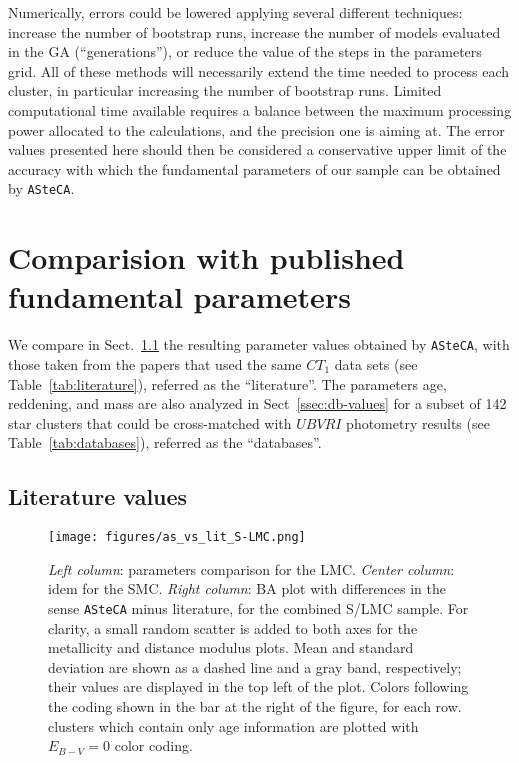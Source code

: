 \documentclass{aa}
\begin{document}
Numerically, errors could be lowered applying several different techniques:
increase the number of bootstrap runs, increase the number of models evaluated
in the GA (``generations''), or reduce the value of the steps in the parameters
grid.
%
All of these methods will necessarily extend the time needed to process each
cluster, in particular increasing the number of bootstrap runs. Limited
computational time available requires a balance between the maximum processing
power allocated to the calculations, and the precision one is aiming at. The
error values presented here should then be considered a conservative upper limit
of the accuracy with which the fundamental parameters of our sample can be
obtained by \texttt{ASteCA}.\@





\section{Comparision with published fundamental parameters}
\label{sec:comp-pub-data}

We compare in Sect.~\ref{ssec:lit-values} the resulting parameter values
obtained by \texttt{ASteCA}, with those taken from the papers that used the same
$CT_1$ data sets (see Table~\ref{tab:literature}), referred as the
``literature''.
%
The parameters age, reddening, and mass are also analyzed in
Sect~\ref{ssec:db-values} for a subset of 142 star clusters that could be
cross-matched with $UBVRI$ photometry results (see Table~\ref{tab:databases}),
referred as the ``databases''.

  

\subsection{Literature values}
\label{ssec:lit-values}

\begin{figure*}
\texttt{[image: figures/as\_vs\_lit\_S-LMC.png]}
\caption{\emph{Left column}: parameters comparison for the LMC.\@
\emph{Center column}: idem for the SMC.\@
\emph{Right column}: BA plot with differences in the sense \texttt{ASteCA} minus
literature, for the combined S/LMC sample. For clarity, a small random scatter
is added to both axes for the metallicity and distance modulus plots. Mean and
standard deviation are shown as a dashed line and a gray band, respectively;
their values are displayed in the top left of the plot.
Colors following the coding shown in the bar at the right of the figure, for
each row.~\cite{Piatti_2011b} clusters which contain only age information are
plotted with $E_{B-V}{=}0$ color coding.}
\label{fig:as_vs_lit}
\end{figure*}
\end{document}
